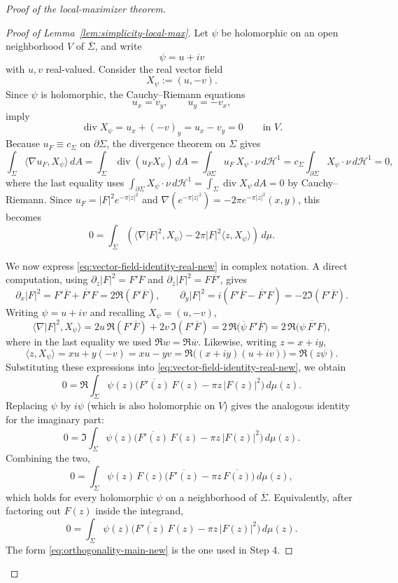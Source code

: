 \documentclass[a4paper,11pt,reqno]{amsart}
\numberwithin{equation}{section}
\theoremstyle{plain} %
\theoremstyle{definition} %
\theoremstyle{remark}
\begin{document}
\begin{proof}[Proof of the local-maximizer theorem]
\begin{proof}[Proof of Lemma~\ref{lem:simplicity-local-max}]
Let \(\psi\) be holomorphic on an open neighborhood \(V\) of
\(\overline \Sigma\), and write
\[
\psi=u+iv
\]
with \(u,v\) real-valued. Consider the real vector field
\[
X_\psi:=(u,-v).
\]
Since \(\psi\) is holomorphic, the Cauchy--Riemann equations
\[
u_x=v_y,
\qquad
u_y=-v_x,
\]
imply
\[
\operatorname{div}X_\psi=u_x+(-v)_y=u_x-v_y=0
\qquad \text{in }V.
\]
Because \(u_F\equiv c_\Sigma\) on \(\partial\Sigma\), the divergence theorem on
\(\Sigma\) gives
\[
\int_\Sigma \langle \nabla u_F, X_\psi\rangle\,dA
=
\int_\Sigma \operatorname{div}(u_F X_\psi)\,dA
=
\int_{\partial \Sigma} u_F\, X_\psi\cdot \nu\, d\mathcal H^1
=
c_\Sigma\int_{\partial \Sigma} X_\psi\cdot \nu\, d\mathcal H^1
=
0,
\]
where the last equality uses
\(\int_{\partial\Sigma}X_\psi\cdot\nu\,d\mathcal H^1
=\int_\Sigma\operatorname{div}X_\psi\,dA=0\) by Cauchy--Riemann. Since
\(u_F=|F|^2e^{-\pi |z|^2}\) and
\(\nabla(e^{-\pi|z|^2})=-2\pi e^{-\pi|z|^2}(x,y)\), this becomes
\begin{equation}\label{eq:vector-field-identity-real-new}
0=
\int_\Sigma
\left(
\langle \nabla |F|^2,X_\psi\rangle
-
2\pi |F|^2 \langle z,X_\psi\rangle
\right)
\,d\mu.
\end{equation}

We now express \eqref{eq:vector-field-identity-real-new} in complex notation.
A direct computation, using \(\partial_z|F|^2=F'\overline F\) and
\(\partial_{\bar z}|F|^2=F\overline{F'}\), gives
\[
\partial_x |F|^2 = F'\overline F+\overline{F'}F = 2\Re(F'\overline F),
\qquad
\partial_y |F|^2 = i(F'\overline F-\overline{F'}F) = -2\Im(F'\overline F).
\]
Writing \(\psi=u+iv\) and recalling \(X_\psi=(u,-v)\),
\[
\langle \nabla |F|^2,X_\psi\rangle
=
2u\,\Re(F'\overline F)+2v\,\Im(F'\overline F)
=
2\,\Re\!\big(\overline{\psi}\,F'\overline F\big)
=
2\,\Re\!\big(\psi\,\overline{F'}F\big),
\]
where in the last equality we used \(\Re w=\Re\overline w\). Likewise, writing
\(z=x+iy\),
\[
\langle z,X_\psi\rangle
=
xu+y(-v)
=
xu-yv
=
\Re\big((x+iy)(u+iv)\big)
=
\Re(z\psi).
\]
Substituting these expressions into
\eqref{eq:vector-field-identity-real-new}, we obtain
\[
0=
\Re\!\int_\Sigma
\psi(z)\Big(\overline{F'(z)}\,F(z)-\pi z\,|F(z)|^2\Big)\,d\mu(z).
\]
Replacing \(\psi\) by \(i\psi\) (which is also holomorphic on \(V\)) gives the
analogous identity for the imaginary part:
\[
0=
\Im\!\int_\Sigma
\psi(z)\Big(\overline{F'(z)}\,F(z)-\pi z\,|F(z)|^2\Big)\,d\mu(z).
\]
Combining the two,
\begin{equation}\label{eq:orthogonality-main-new}
0=
\int_\Sigma
\psi(z)\,F(z)\Big(\overline{F'(z)}-\pi z\,\overline{F(z)}\Big)\,d\mu(z),
\end{equation}
which holds for every holomorphic \(\psi\) on a neighborhood of
\(\overline \Sigma\). Equivalently, after factoring out \(F(z)\) inside the
integrand,
\begin{equation*}
0=
\int_\Sigma
\psi(z)\Big(\overline{F'(z)}\,F(z)-\pi z\,|F(z)|^2\Big)\,d\mu(z).
\end{equation*}
The form \eqref{eq:orthogonality-main-new} is the one used in Step 4.


\end{proof}
\end{proof}
\end{document}
